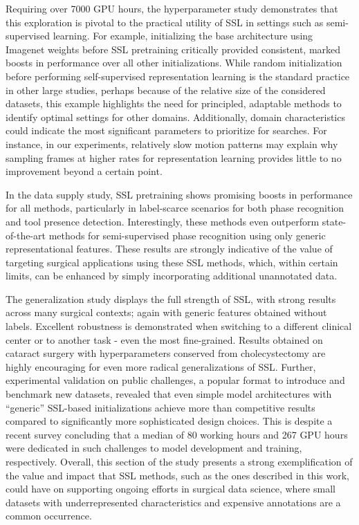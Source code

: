 \documentclass[times,twocolumn,final]{elsarticle}
\begin{document}
Requiring over 7000 GPU hours, the hyperparameter study demonstrates that this exploration is pivotal to the practical utility of SSL in settings such as semi-supervised learning. For example, initializing the base architecture using Imagenet weights before SSL pretraining critically provided consistent, marked boosts in performance over all other initializations. While random initialization before performing self-supervised representation learning is the standard practice in other large studies, perhaps because of the relative size of the considered datasets, this example highlights the need for principled, adaptable methods to identify optimal settings for other domains. Additionally, domain characteristics could indicate the most significant parameters to prioritize for searches. For instance, in our experiments, relatively slow motion patterns may explain why sampling frames at higher rates for representation learning provides little to no improvement beyond a certain point.

In the data supply study, SSL pretraining shows promising boosts in performance for all methods, particularly in label-scarce scenarios for both phase recognition and tool presence detection. Interestingly, these methods even outperform state-of-the-art methods for semi-supervised phase recognition using only generic representational features. These results are strongly indicative of the value of targeting surgical applications using these SSL methods, which, within certain limits, can be enhanced by simply incorporating additional unannotated data.

{\color{newtext} The generalization study displays the full strength of SSL, with strong results across many surgical contexts; again with generic features obtained without labels. Excellent robustness is demonstrated when switching to a different clinical center or to another task - even the most fine-grained. Results obtained on cataract surgery with hyperparameters conserved from cholecystectomy are highly encouraging for even more radical generalizations of SSL. Further, experimental validation on public challenges, a popular format to introduce and benchmark new datasets, revealed that even simple model architectures with ``generic'' SSL-based initializations achieve more than competitive results compared to significantly more sophisticated design choices. This is despite a recent survey \citep{challengessurvey} concluding that a median of 80 working hours and 267 GPU hours were dedicated in such challenges to model development and training, respectively.
Overall, this section of the study presents a strong exemplification of the value and impact that SSL methods, such as the ones described in this work, could have on supporting ongoing efforts in surgical data science, where small datasets with underrepresented characteristics and expensive annotations are a common occurrence.}
\end{document}
